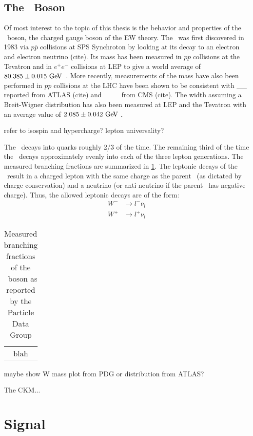 \subsection{The \dubya~Boson}
Of most interest to the topic of this thesis is the behavior and properties
of the \dubya~boson, the charged gauge boson of the EW theory.
The \dubya~was first discovered in 1983 via $p\overline{p}$ collisions
at SPS Synchroton by looking at its decay to an electron %
and electron neutrino (cite).
Its mass has been measured in $p\overline{p}$ collisions at the Tevatron
and in $e^{+}e^{-}$ collisions at LEP to give a world 
average of $80.385 \pm 0.015\GeV$~\cite{PDG:2014}.
More recently, measurements of the mass have also been 
performed in $pp$ collisions at the LHC have been shown to be consistent
with \_\_ reported from ATLAS (cite) and \_\_\_ from CMS (cite).
The width assuming a Breit-Wigner distribution has also been measured 
at LEP and the Tevatron with an average value 
of $2.085\pm0.042\GeV$ \cite{PDG:2014}. %

refer to isospin and hypercharge?
lepton universality?

The \dubya~decays into quarks roughly 2/3 of the time. 
The remaining third of the time the \dubya~decays approximately 
evenly into each of the three lepton generations.
The measured branching fractions are summarized in \tab\ref{tab:theory_wdecay}.
The leptonic decays of the \dubya~result in a charged lepton 
with the same charge as the parent \dubya~(as dictated by charge conservation)
and a neutrino (or anti-neutrino if the parent \dubya~has negative charge).
Thus, the allowed leptonic decays are of the form:
\begin{align*}
W^{-} &\rightarrow l^{-} \overline{\nu}_l \\
W^{+} &\rightarrow l^{+} \nu_l
\end{align*}

\begin{table}[ht]
\begin{tabular}{c}
blah 
\end{tabular}
\caption{Measured branching fractions of the \dubya~boson as reported
by the Particle Data Group \cite{PDG:2014}}
\label{tab:theory_wdecay}
\end{table}

maybe show W mass plot from PDG or distribution from ATLAS?

The CKM...


\section{Signal}
